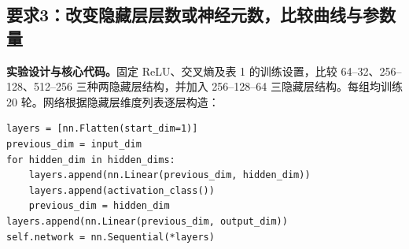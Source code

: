 \documentclass[UTF8,11pt,a4paper,fontset=fandol]{ctexart}
\newcommand{\question}[1]{\Needspace{14\baselineskip}\subsection{#1}}
\begin{document}
\question{要求3：改变隐藏层层数或神经元数，比较曲线与参数量}
\textbf{实验设计与核心代码。}固定 ReLU、交叉熵及表 1 的训练设置，比较 64--32、256--128、512--256 三种两隐藏层结构，并加入 256--128--64 三隐藏层结构。每组均训练 20 轮。网络根据隐藏层维度列表逐层构造：
\par\noindent\begin{minipage}{\linewidth}
\begin{lstlisting}
layers = [nn.Flatten(start_dim=1)]
previous_dim = input_dim
for hidden_dim in hidden_dims:
    layers.append(nn.Linear(previous_dim, hidden_dim))
    layers.append(activation_class())
    previous_dim = hidden_dim
layers.append(nn.Linear(previous_dim, output_dim))
self.network = nn.Sequential(*layers)
\end{lstlisting}
\end{minipage}\par
\end{document}
